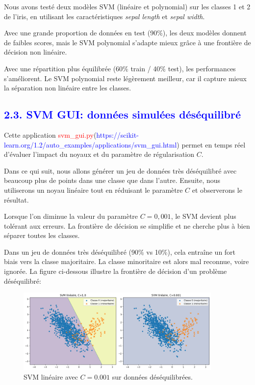 \documentclass[
  12pt,
]{article}
\begin{document}
Nous avons testé deux modèles SVM (linéaire et polynomial) sur les
classes 1 et 2 de l'iris, en utilisant les caractéristiques
\textit{sepal length} et \textit{sepal width}.

Avec une grande proportion de données en test (90\%), les deux modèles
donnent de faibles scores, mais le SVM polynomial s'adapte mieux grâce à
une frontière de décision non linéaire.

Avec une répartition plus équilibrée (60\% train / 40\% test), les
performances s'améliorent. Le SVM polynomial reste légèrement meilleur,
car il capture mieux la séparation non linéaire entre les classes.

\subsection{\texorpdfstring{\textcolor{blue}{2.3. SVM GUI: données simulées déséquilibré}}{}}\label{section-4}

Cette application
\textcolor{red}{svm\_gui.py}(\textcolor{blue}{https://scikit-learn.org/1.2/auto\_examples/applications/svm\_gui.html})
permet en temps réel d'évaluer l'impact du noyaux et du paramètre de
régularisation \(C\).

Dans ce qui suit, nous allons générer un jeu de données très
déséquilibré avec beaucoup plus de points dans une classe que dans
l'autre. Ensuite, nous utiliserons un noyau linéaire tout en réduisant
le paramètre \(C\) et observerons le résultat.

Lorsque l'on diminue la valeur du paramètre \(C=0,001\), le SVM devient
plus tolérant aux erreurs. La frontière de décision se simplifie et ne
cherche plus à bien séparer toutes les classes.

Dans un jeu de données très déséquilibré (90\% vs 10\%), cela entraîne
un fort biais vers la classe majoritaire. La classe minoritaire est
alors mal reconnue, voire ignorée. La figure ci-dessous illustre la
frontière de décision d'un problème déséquilibré:

\begin{figure}[H]
    \centering
    \includegraphics[width=0.9\textwidth]{vis/classif_simul_cpetit.png}
    \caption{SVM linéaire avec $C = 0.001$ sur données déséquilibrées.}
    \label{fig:simule_c_petit}
\end{figure}
\end{document}
